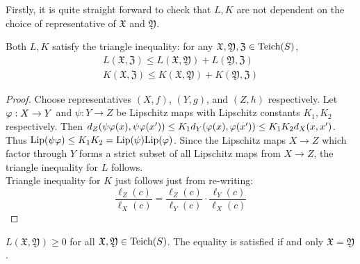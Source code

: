 Firstly, it is quite straight forward to check that $L,K$ are not dependent on the choice of representative of $ \mathfrak{X}$ and $ \mathfrak{Y}$.
\begin{proposition}
  Both $L,K$ satisfy the triangle inequality: for any $ \mathfrak{X},\mathfrak{Y}, \mathfrak{Z}\in \text{Teich}(S)$,
      \begin{align}
        L( \mathfrak{X}, \mathfrak{Z}) \leq L( \mathfrak{X}, \mathfrak{Y}) + L( \mathfrak{Y}, \mathfrak{Z})\\
        K( \mathfrak{X}, \mathfrak{Z}) \leq K( \mathfrak{X}, \mathfrak{Y}) + K( \mathfrak{Y}, \mathfrak{Z})
      \end{align}
\end{proposition}
\begin{proof}
  Choose representatives $(X,f)$, $(Y,g)$, and $(Z,h)$ respectively. Let $\varphi:X\to Y$ and $\psi: Y\to Z$ be Lipschitz maps with Lipschitz constants $K_1, K_2$ respectively. Then $d_{Z}(\psi\varphi(x),\psi\varphi(x'))\leq K_1d_{Y}(\varphi(x),\varphi(x'))\leq K_1K_2 d_{X}(x,x')$. Thus $\text{Lip}(\psi\varphi)\leq K_1K_2 = \text{Lip}(\psi)\text{Lip}(\varphi)$. Since the Lipschitz maps $X\to Z$ which factor through $Y$ forms a strict subset of all Lipschitz maps from $X\to Z$, the triangle inequality for $L$ follows.\\

  Triangle inequality for $K$ just follows just from re-writing:
  $$\frac{\ell_{Z}(c)}{\ell_X(c)} = \frac{\ell_{Z}(c)}{\ell_Y(c)}\cdot \frac{\ell_{Y}(c)}{\ell_X(c)}$$
\end{proof}
\begin{theorem}
  $L( \mathfrak{X}, \mathfrak{Y})\geq 0$ for all $ \mathfrak{X}, \mathfrak{Y}\in \text{Teich}(S)$. The equality is satisfied if and only $ \mathfrak{X} = \mathfrak{Y}$.
\end{theorem}
